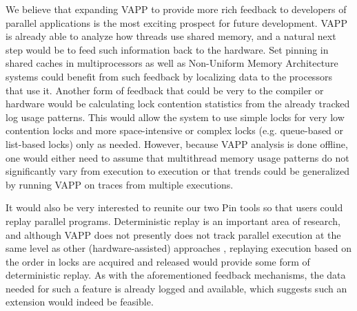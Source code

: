 We believe that expanding VAPP to provide more rich feedback to
developers of parallel applications is the most exciting prospect
for future development.  VAPP is already able to analyze how
threads use shared memory, and a natural next step would be to
feed such information back to the hardware.  Set pinning in
shared caches in multiprocessors as well as Non-Uniform Memory Architecture
systems could benefit from such feedback by localizing data
to the processors that use it.  Another form of feedback
that could be very to the compiler or hardware would be calculating
lock contention statistics from the already tracked log usage patterns.
This would allow the system to use simple locks for very low contention
locks and more space-intensive or complex locks (e.g. queue-based 
or list-based locks) only as needed.  However, because VAPP analysis
is done offline, one would either need to assume that multithread
memory usage patterns do not significantly vary from execution to
execution or that trends could be generalized by running VAPP on
traces from multiple executions.

It would also be very interested to reunite our two Pin tools
so that users could replay parallel programs.  Deterministic
replay is an important area of research, and although VAPP does not
presently does not track parallel execution at the same level as
other (hardware-assisted) approaches \cite{narayansamy2005bugnet},
replaying execution based on the order in locks are acquired and
released would provide some form of deterministic replay.  As with
the aforementioned feedback mechanisms, the data needed for such a
feature is already logged and available, which suggests such an
extension would indeed be feasible.